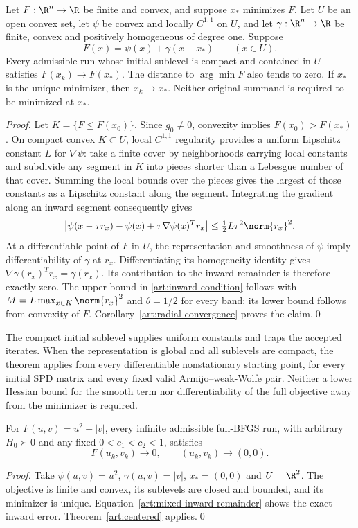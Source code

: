\begin{theorem}\label{art:centered}
Let $F:\R^n\to\R$ be finite and convex, and suppose $x_*$ minimizes $F$.
Let $U$ be an open convex set, let $\psi$ be convex and locally $C^{1,1}$ on
$U$, and let $\gamma:\R^n\to\R$ be finite, convex and positively homogeneous
of degree one. Suppose
\[
 F(x)=\psi(x)+\gamma(x-x_*)\qquad(x\in U).
\]
Every admissible run whose initial sublevel is compact and contained in $U$
satisfies $F(x_k)\to F(x_*)$. The distance to $\arg\min F$ also tends to zero. If $x_*$ is the unique
minimizer, then $x_k\to x_*$. Neither original summand is required to be
minimized at $x_*$.
\end{theorem}
\begin{proof}
Let $K=\{F\le F(x_0)\}$. Since $g_0\ne0$, convexity implies
$F(x_0)>F(x_*)$. On compact convex $K\subset U$, local $C^{1,1}$ regularity
provides a uniform Lipschitz constant $L$ for $\nabla\psi$: take a finite
cover by neighborhoods carrying local constants and subdivide any segment in
$K$ into pieces shorter than a Lebesgue number of that cover. Summing the
local bounds over the pieces gives the largest of those constants as a
Lipschitz constant along the segment. Integrating the gradient along an
inward segment consequently gives
\[
 \left|\psi(x-\tau r_x)-\psi(x)
             +\tau\nabla\psi(x)^Tr_x\right|
 \le\tfrac12L\tau^2\norm{r_x}^2.
\]
At a differentiable point of $F$ in $U$, the representation and smoothness of
$\psi$ imply differentiability of $\gamma$ at $r_x$. Differentiating its
homogeneity identity gives $\nabla\gamma(r_x)^Tr_x=\gamma(r_x)$.
Its contribution to the inward remainder is therefore exactly zero.
The upper bound in \eqref{art:inward-condition} follows with
$M=L\max_{x\in K}\norm{r_x}^2$ and $\theta=1/2$ for every band; its lower bound
follows from convexity of $F$.
Corollary~\ref{art:radial-convergence} proves the claim.\qed
\end{proof}


The compact initial sublevel supplies uniform constants and traps the accepted
iterates. When the representation is global and all sublevels are compact,
the theorem applies from every differentiable nonstationary starting point,
for every initial SPD matrix and every fixed valid Armijo--weak-Wolfe pair.
Neither a lower Hessian bound for the smooth term nor differentiability of
the full objective away from the minimizer is required.

\begin{corollary}\label{art:mixed-benchmark}
For $F(u,v)=u^2+|v|$, every infinite admissible full-BFGS run, with arbitrary
$H_0\succ0$ and any fixed $0<c_1<c_2<1$, satisfies
\[
 F(u_k,v_k)\longrightarrow0,\qquad (u_k,v_k)\longrightarrow(0,0).
\]
\end{corollary}
\begin{proof}
Take $\psi(u,v)=u^2$, $\gamma(u,v)=|v|$, $x_*=(0,0)$ and $U=\R^2$.
The objective is finite and convex, its sublevels are closed and bounded,
and its minimizer is unique. Equation~\eqref{art:mixed-inward-remainder}
shows the exact inward error. Theorem~\ref{art:centered} applies.\qed
\end{proof}

